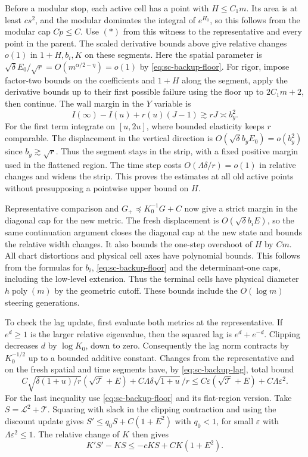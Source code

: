\documentclass[11pt]{article}
\newcommand{\1}{\mathbf{1}}
\numberwithin{equation}{section}
\begin{document}
Before a modular stop, each active cell has a point with
\(H\le C_1m\). Its area is at least \(cs^2\), and the
modular dominates the integral of \(e^{H_0}\), so
this follows from the modular cap \(Cp\le C\).
Use \((*)\) from this witness to the representative and every
point in the parent. The scaled derivative bounds above
give relative changes \(o(1)\) in \(1+H,b_i,K\) on these
segments. Here the spatial parameter is
\(\sqrt\delta E_0/\sqrt{r}=O(m^{\alpha/2-\eta})=o(1)\)
by \eqref{eq:sc-backup-floor}. For rigor, impose factor-two
bounds on the coefficients and \(1+H\) along the segment,
apply the derivative bounds up to their first possible
failure using the floor up to \(2C_1m+2\), then continue.
The wall margin in the \(Y\) variable is
\[
 I(\infty)-I(u)+r(u)(J-1)\gtrsim rJ\asymp b_y^2 .
\]
For the first term integrate on \([u,2u]\), where bounded
elasticity keeps \(r\) comparable. The displacement in the
vertical direction is \(O(\sqrt\delta b_y E_0)=o(b_y^2)\)
since \(b_y\gtrsim\sqrt r\). Thus the segment stays in the
strip, with a fixed positive margin used in the flattened region.
The time step costs \(O(\Lambda\delta/r)=o(1)\) in relative
changes and widens the strip. This proves the estimates at
all old active points without presupposing a pointwise
upper bound on \(H\).

Representative comparison and
\(G_+\preceq K_0^{-1}G+C\) now give a strict margin in the
diagonal cap for the new metric. The fresh displacement
is \(O(\sqrt\delta b_i E)\), so the same continuation
argument closes the diagonal cap at the new state and
bounds the relative width changes. It also bounds the
one-step overshoot of \(H\) by \(C m\).
All chart distortions and physical cell axes have polynomial
bounds. This follows from the formulas for \(b_i\),
\eqref{eq:sc-backup-floor} and the determinant-one caps,
including the low-level extension. Thus the terminal cells
have physical diameter \(h\operatorname{poly}(m)\) by the
geometric cutoff. These bounds include the \(O(\log m)\)
steering generations.

To check the lag update, first evaluate both metrics at
the representative. If \(e^d\ge1\) is the larger relative
eigenvalue, then the squared lag is \(e^d+e^{-d}\).
Clipping decreases \(d\) by \(\log K_0\), down to zero.
Consequently the lag norm contracts by \(K_0^{-1/2}\)
up to a bounded additive constant. Changes from the
representative and on the fresh spatial and time segments
have, by \eqref{eq:sc-backup-lag}, total bound
\[
 C\sqrt{\delta(1+u)/r}(\sqrt{\mathcal T}+E)
       + C\Lambda\delta\sqrt{1+u}/r
 \le C\varepsilon(\sqrt{\mathcal T}+E)+C\Lambda\varepsilon^2 .
\]
For the last inequality use \eqref{eq:sc-backup-floor} and
its flat-region version. Take
\(S=\mathcal L^2+\mathcal T\). Squaring with slack in the
clipping contraction and using the discount update gives
\(S'\le q_0 S+C(1+E^2)\) with \(q_0<1\), for small
\(\varepsilon\) with \(\Lambda\varepsilon^2\le1\).
The relative change of \(K\) then gives
\[
 K'S'-KS\le-cKS+CK(1+E^2).
 \tag{**}
\]
\end{document}
